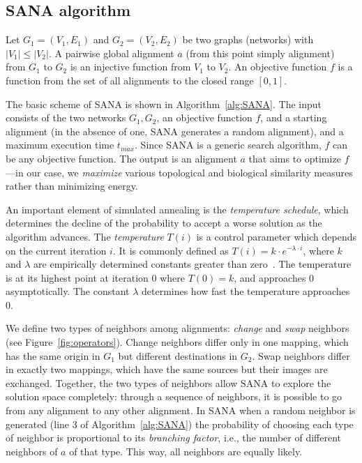 \documentclass{bioinfo}
\begin{document}
\begin{methods}
\subsection{SANA algorithm}
Let $G_1=(V_1,E_1)$ and $G_2=(V_2,E_2)$ be two graphs (networks) with $|V_1|\leq|V_2|$. A pairwise global alignment $a$ (from this point simply alignment) from $G_1$ to $G_2$ is an injective function from $V_1$ to $V_2$. An objective function $f$ is a function from the set of all alignments to the closed range $[0,1]$.

The basic scheme of SANA is shown in Algorithm~\ref{alg:SANA}. The input consists of the two networks $G_1,G_2$, an objective function $f$, and a starting alignment (in the absence of one, SANA generates a random alignment), and a maximum execution time $t_{max}$. Since SANA is a generic search algorithm, $f$ can be any objective function. The output is an alignment $a$ that aims to optimize $f$---in our case, we {\it maximize} various topological and biological similarity measures rather than minimizing energy.

An important element of simulated annealing is the \textit{temperature schedule}, which determines the decline of the probability to accept a worse solution as the algorithm advances. The \textit{temperature} $T(i)$ is a control parameter which depends on the current iteration $i$. It is commonly defined as $T(i)=k\cdot e^{-\lambda\cdot i}$, where $k$ and $\lambda$ are empirically determined constants greater than zero~\citep{SA1}. The temperature is at its highest point at iteration 0 where $T(0)=k$, and approaches 0 asymptotically. The constant $\lambda$ determines how fast the temperature approaches 0.

We define two types of neighbors among alignments: \textit{change} and \textit{swap} neighbors (see Figure~\ref{fig:operators}). Change neighbors differ only in one mapping, which has the same origin in $G_1$ but different destinations in $G_2$. Swap neighbors differ in exactly two mappings, which have the same sources but their images are exchanged. Together, the two types of neighbors allow SANA to explore the solution space completely: through a sequence of neighbors, it is possible to go from any alignment to any other alignment. In SANA when a random neighbor is generated (line 3 of Algorithm~\ref{alg:SANA}) the probability of choosing each type of neighbor is proportional to its \textit{branching factor}, i.e., the number of different neighbors of $a$ of that type. This way, all neighbors are equally likely.


\end{methods}
\end{document}
